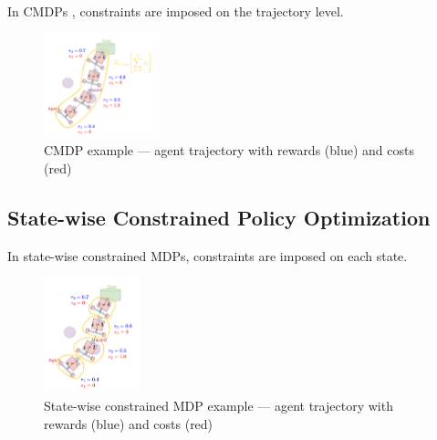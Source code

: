 \documentclass[8pt, aspectratio=169]{beamer} %
\begin{document}
\begin{frame}{\insertsubsectionhead}

  In CMDPs \cite{altman2021constrained}, constraints are imposed on the trajectory level.

  \begin{figure}
    \includegraphics[width=0.3\textwidth]{figures/constrained-rl2.pdf}
    \caption{CMDP example — agent trajectory with rewards (blue) and costs (red)}
  \end{figure}


\end{frame}


\subsection{State-wise Constrained Policy Optimization}

\begin{frame}{\insertsubsectionhead}

  In state-wise constrained MDPs, constraints are imposed on each state.

  \begin{figure}
    \includegraphics[width=0.25\textwidth]{figures/statewise-constrained-rl.pdf}
    \caption{State-wise constrained MDP example — agent trajectory with rewards (blue) and costs (red)}
  \end{figure}

\end{frame}
\end{document}
